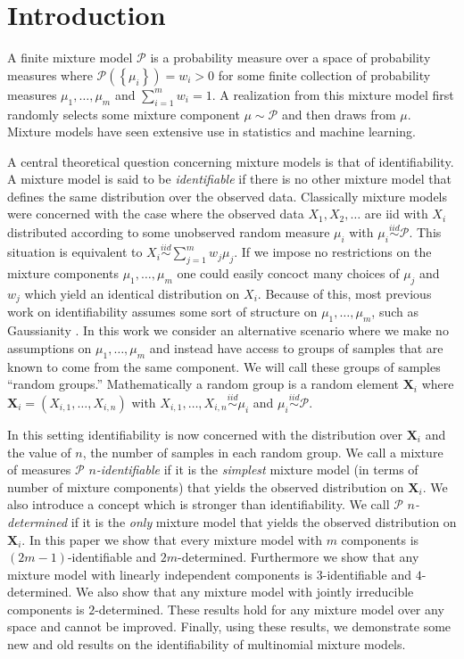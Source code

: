 \documentclass[aos,preprint]{imsart}
\def\r{\right}
\def\sP{\mathscr{P}}
\def\bX{\mathbf{X}}
\def\simiid{\overset{iid}{\sim}}
\theoremstyle{plain}
\theoremstyle{defintion}
\begin{document}
\section{Introduction}
A finite mixture model $\sP$ is a probability measure over a space of probability measures where $\sP\left( \left\{ \mu_i \right\} \right)=w_i >0$ for some finite collection of probability measures $\mu_1,\ldots,\mu_m$ and $\sum_{i=1}^m w_i = 1$. A realization from this mixture model first randomly selects some mixture component $\mu \sim \sP$ and then draws from $\mu$. Mixture models have seen extensive use in statistics and machine learning.

A central theoretical question concerning mixture models is that of identifiability. A mixture model is said to be {\em identifiable} if there is no other mixture model that defines the same distribution over the observed data. Classically mixture models were concerned with the case where the observed data $X_1,X_2,\ldots$ are iid with $X_i$ distributed according to some unobserved random measure $\mu_i$ with $\mu_i\simiid \sP$. This situation is equivalent to $X_i \simiid \sum_{j=1}^m w_j \mu_j$. If we impose no restrictions on the mixture components $\mu_1,\ldots,\mu_m$ one could easily concoct many choices of $\mu_j$ and $w_j$ which yield an identical distribution on $X_i$. Because of this, most previous work on identifiability assumes some sort of structure on $\mu_1,\ldots,\mu_m$, such as Gaussianity \cite{anderson14,bruni85, yakowitz68}. In this work we consider an alternative scenario where we make no assumptions on $\mu_1,\ldots,\mu_m$ and instead have access to groups of samples that are known to come from the same component. We will call these groups of samples ``random groups.'' Mathematically a random group is a random element $\bX_i$ where $\bX_i = \left( X_{i,1},\ldots,X_{i,n} \right)$ with $X_{i,1},\ldots,X_{i,n}\simiid \mu_i$ and $\mu_i \simiid \sP$.

In this setting identifiability is now concerned with the distribution over $\bX_i$ and the value of $n$, the number of samples in each random group. We call a mixture of measures $\sP$ {\em $n$-identifiable} if it is the {\em simplest} mixture model (in terms of number of mixture components) that yields the observed distribution on $\bX_i$. We also introduce a concept which is stronger than identifiability. We call $\sP$ {\em $n$-determined} if it is the {\em only} mixture model that yields the observed distribution on $\bX_i$. In this paper we show that every mixture model with $m$ components is $\left(2m-1\r)$-identifiable and $2m$-determined. Furthermore we show that any mixture model with linearly independent components is $3$-identifiable and $4$-determined. We also show that any mixture model with jointly irreducible components is $2$-determined. These results hold for any mixture model over any space and cannot be improved. Finally, using these results, we demonstrate some new and old results on the identifiability of multinomial mixture models.
\end{document}
